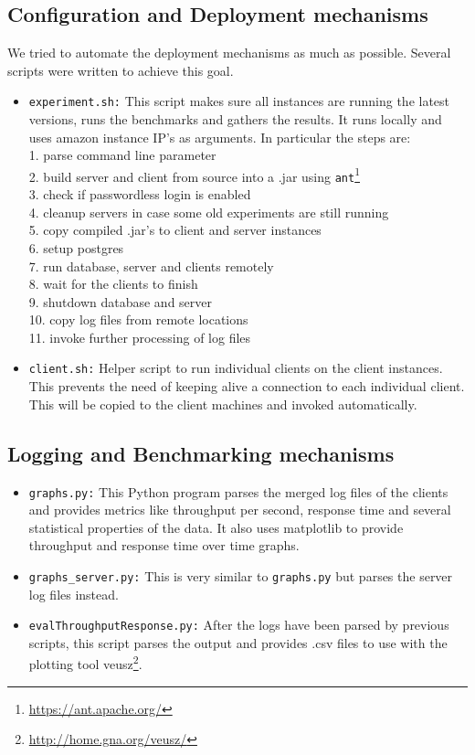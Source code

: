 \documentclass[11pt]{article}
\begin{document}
\subsection{Configuration and Deployment mechanisms}\label{sec:configuration-and-deployment-mechanisms}
We tried to automate the deployment mechanisms as much as possible. Several scripts were written to achieve this goal.
\begin{itemize}
  \item \texttt{experiment.sh:} This script makes sure all instances are running the latest versions, runs the benchmarks and gathers the results. It runs locally and uses amazon instance IP's as arguments. In particular the steps are: \\1. parse command line parameter \\2. build server and client from source into a .jar using \texttt{ant}\footnote{\url{https://ant.apache.org/}} \\3. check if passwordless login is enabled \\4. cleanup servers in case some old experiments are still running \\5. copy compiled .jar's to client and server instances \\6. setup postgres \\7. run database, server and clients remotely \\8. wait for the clients to finish \\9. shutdown database and server \\10. copy log files from remote locations \\11. invoke further processing of log files
  \item \texttt{client.sh:} Helper script to run individual clients on the client instances. This prevents the need of keeping alive a connection to each individual client. This will be copied to the client machines and invoked automatically.
\end{itemize}
\subsection{Logging and Benchmarking mechanisms}\label{sec:logging-and-benchmarking-mechanisms}
\begin{itemize}
  \item \texttt{graphs.py:} This Python program parses the merged log files of the clients and provides metrics like throughput per second, response time and several statistical properties of the data. It also uses matplotlib to provide throughput and response time over time graphs.
  \item \texttt{graphs\_server.py:} This is very similar to \texttt{graphs.py} but parses the server log files instead.
  \item \texttt{evalThroughputResponse.py:} After the logs have been parsed by previous scripts, this script parses the output and provides .csv files to use with the plotting tool veusz\footnote{\url{http://home.gna.org/veusz/}}.
 \end{itemize}
\end{document}

